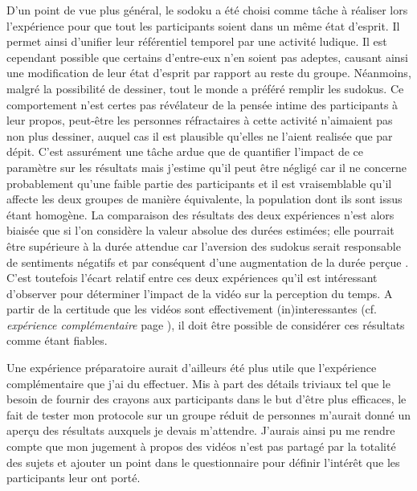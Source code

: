 \documentclass[12pt,fleqn,oneside,openany]{book} %
\begin{document}
D'un point de vue plus général, le sodoku a été choisi comme tâche à réaliser lors l'expérience pour que tout les participants soient dans un même état d'esprit. Il permet ainsi d'unifier leur référentiel temporel par une activité ludique. Il est cependant possible que certains d'entre-eux n'en soient pas adeptes, causant ainsi une modification de leur état d'esprit par rapport au reste du groupe. Néanmoins, malgré la possibilité de dessiner, tout le monde a préféré remplir les sudokus. Ce comportement n'est certes pas révélateur de la pensée intime des participants à leur propos, peut-être les personnes réfractaires à cette activité n'aimaient pas non plus dessiner, auquel cas il est plausible qu'elles ne l'aient realisée que par dépit. C'est assurément une tâche ardue que de quantifier l'impact de ce paramètre sur les résultats mais j'estime qu'il peut être négligé car il ne concerne probablement qu'une faible partie des participants et il est vraisemblable qu'il affecte les deux groupes de manière équivalente, la population dont ils sont issus étant homogène. La comparaison des résultats des deux expériences n'est alors biaisée que si l'on considère la valeur absolue des durées estimées; elle pourrait être supérieure à la durée attendue car l'aversion des sudokus serait responsable de sentiments négatifs et par conséquent d'une augmentation de la durée perçue \cite{emotionsTemps,emotionsTemps2}. C'est toutefois l'écart relatif entre ces deux expériences qu'il est intéressant d'observer pour déterminer l'impact de la vidéo sur la perception du temps. A partir de la certitude que les vidéos sont effectivement (in)interessantes (cf. \emph{expérience complémentaire} page \pageref{ssec:exp1.2}), il doit être possible de considérer ces résultats comme étant fiables. 

Une expérience préparatoire aurait d'ailleurs été plus utile que l'expérience complémentaire que j'ai du effectuer. Mis à part des détails triviaux tel que le besoin de fournir des crayons aux participants dans le but d'être plus efficaces, le fait de tester mon protocole sur un groupe réduit de personnes m'aurait donné un aperçu des résultats auxquels je devais m'attendre. J'aurais ainsi pu me rendre compte que mon jugement à propos des vidéos n'est pas partagé par la totalité des sujets et ajouter un point dans le questionnaire pour définir l'intérêt que les participants leur ont porté.
\end{document}
